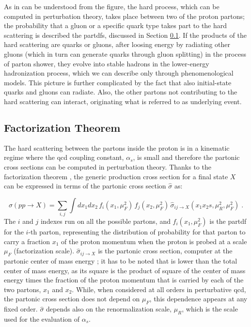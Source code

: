 As in can be understood from the figure, the hard process, which can be computed in perturbation theory, takes place between two of the proton partons; the probability that a gluon or a specific quark type takes part to the hard scattering is described the \glspl{partdf}, discussed in Section \ref{sec:ppint:hardscatter}. If the products of the hard scattering are quarks or gluons, after loosing energy by radiating other gluons (which in turn can generate quarks through gluon splitting) in the process of parton shower, they evolve into stable hadrons in the lower-energy hadronization process, which we can describe only through phenomenological models.
This picture is further complicated by the fact that also initial-state quarks and gluons can radiate. Also, the other partons not contributing to the hard scattering can interact, originating what is referred to as underlying event. 

\subsection{Factorization Theorem}
\label{sec:ppint:hardscatter}

The hard scattering between the partons inside the proton is in a kinematic regime where the \gls{qcd} coupling constant, $\alpha_s$, 
is small and therefore the partonic cross sections can be computed in perturbation theory. 
Thanks to the factorization theorem \cite{doi:10.1146}, the generic production cross section for a final state $X$ can be expressed in terms of the partonic cross section $\hat\sigma$ as:

\begin{equation}
  \label{eq:general-cross-section}
  \sigma(pp\rightarrow X) = \sum_{i,j} \int dx_1 dx_2\, 
     f_{i}(x_1,\mu_F^2)\, f_{j}(x_2,\mu_F^2)\, 
     \hat\sigma_{ij\rightarrow X}(x_1 x_2 s, \mu_R^2, \mu_F^2) \; .
\end{equation}
The $i$ and $j$ indexes run on all the possible partons, and $f_{i}(x_1,\mu_F^2)$ is the \gls{partdf} for the $i$-th parton, representing 
the distribution of probability for that parton to carry a fraction $x_1$ of the proton momentum when the proton is probed at a scale $\mu_F$
(factorization scale). $\hat\sigma_{ij\rightarrow X}$ is the partonic cross section, computer at the partonic center of mass energy \cmpart;   
it has to be noted that \cmpart is lower than the total center of mass energy, as its square is the product of square of the center of mass energy times
the fraction of the proton momentum that is carried by each of the two partons, $x_1$ and $x_2$. 
While, when considered at all orders in perturbative \gls{qcd}, the partonic cross section does not depend on $\mu_F$,
this dependence appears at any fixed order. $\hat\sigma$ depends also on the renormalization scale, $\mu_R$, which is the scale used for the evaluation of $\alpha_s$.



